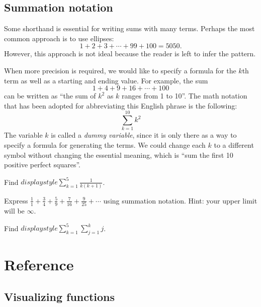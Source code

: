 \documentclass[indent]{watsonbook}
\begin{document}
\subsection{Summation notation}

Some shorthand is essential for writing sums with many terms. Perhaps
the most common approach is to use ellipses:
\[
  1 + 2  + 3 + \cdots + 99 + 100 = 5050.
\]
However, this approach is not ideal because the reader is left to
infer the pattern.

When more precision is required, we would like to specify a formula
for the $k$th term as well as a starting and ending value. For
example, the sum
\[
  1 + 4 + 9 + 16 + \cdots + 100
\]
can be written as ``the sum of $k^2$ as $k$ ranges from 1 to
10''. The math notation that has been adopted for abbreviating this
English phrase is the following:
\[
  \sum_{k=1}^{10} k^2
\]
The variable $k$ is called a \textit{dummy variable}, since it is
only there as a way to specify a formula for generating the
terms. We could change each $k$ to a different symbol without
changing the essential meaning, which is ``sum the first 10 positive
perfect squares''.

\begin{exercise}{}{}
  Find ${d}isplaystyle{\sum_{k=1}^5\frac{1}{k(k+1)}}$.
\end{exercise}

\begin{exercise}{}{}
  Express
  $\tfrac{1}{1} + \tfrac{3}{4} + \tfrac{5}{9} + \tfrac{7}{16} +
  \tfrac{9}{25} + \cdots$ using summation notation. Hint: your upper
  limit will be $\infty$.
\end{exercise}

\begin{exercise}{}{}
  Find ${d}isplaystyle{\sum_{k=1}^5\sum_{j=1}^k j }$.
\end{exercise}

\newpage

\section{Reference}

\subsection{Visualizing functions}
\end{document}
